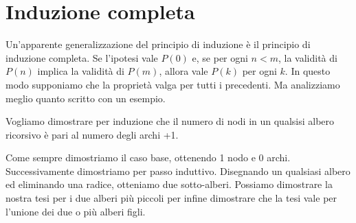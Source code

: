 \section{Induzione completa}
Un’apparente generalizzazione del principio di induzione è il principio di induzione completa. 
Se l'ipotesi vale $P (0)$ e, se per ogni $n < m$, la validità di $P (n)$ implica la validità di $P (m)$, allora vale $P (k)$ per ogni $k$.
In questo modo supponiamo che la proprietà valga per tutti i precedenti. Ma analizziamo meglio quanto scritto con un esempio.
\begin{example}
    Vogliamo dimostrare per induzione che il numero di nodi in un qualsisi albero ricorsivo è pari al numero degli archi +1.
    
    \begin{center}
    \end{center}
    
    Come sempre dimostriamo il caso base, ottenendo 1 nodo e 0 archi.
    Successivamente dimostriamo per passo induttivo. Disegnando un qualsiasi albero ed eliminando una radice, otteniamo due sotto-alberi. Possiamo dimostrare la nostra tesi per i due alberi più piccoli per infine dimostrare che la tesi vale per l'unione dei due o più alberi figli.
\end{example}
